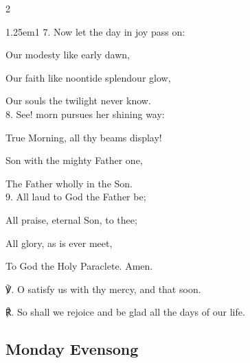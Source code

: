 \begin{multicols}{2}
\begin{hangparas}{1.25em}{1}
7. Now let the day in joy pass on:

Our modesty like early dawn,

Our faith like noontide splendour glow,

Our souls the twilight never know.\\

8. See! morn pursues her shining way:

True Morning, all thy beams display!

Son with the mighty Father one,

The Father wholly in the Son.\\

9. All laud to God the Father be;

All praise, eternal Son, to thee;

All glory, as is ever meet,

To God the Holy Paraclete. Amen.\\
\end{hangparas}

℣. O satisfy us with thy mercy, and that soon.

℟. So shall we rejoice and be glad all the days of our life.


\fussy
\end{multicols}

\subsection{Monday Evensong}\label{MondayEvensong}

\vspace{-1\baselineskip}

